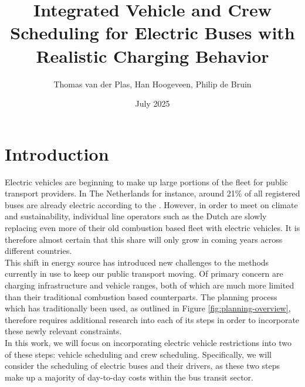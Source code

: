 \documentclass[]{article}
\title{Integrated Vehicle and Crew Scheduling for Electric Buses with Realistic Charging Behavior}
\date{July 2025}
\author{Thomas van der Plas, Han Hoogeveen, Philip de Bruin}
\begin{document}
\maketitle

\section{Introduction}
Electric vehicles are beginning to make up large portions of the fleet for
public transport providers. In The Netherlands for instance, around 21\% of all
registered buses are already electric according to the \citet{RDW}. However,
in order to meet \citet{europaRegulation20181999} on climate and sustainability, individual
line operators such as the Dutch \citet{qbuzzQbuzz} are slowly replacing even more of their old
combustion based fleet with electric vehicles. It is therefore almost certain that this share will only grow in
coming years across different countries. \\
This shift in energy source has introduced new challenges to the methods currently in use to keep our public transport moving. Of primary concern are charging infrastructure and vehicle ranges, both of which are much more limited than their traditional combustion based counterparts. The planning process which has traditionally been used, as outlined in Figure \ref{fig:planning-overview}, therefore requires additional research into each of its steps in order to incorporate these newly relevant constraints.\\
\noindent In this work, we will focus on incorporating electric vehicle restrictions into two of these steps: vehicle scheduling and crew scheduling. Specifically, we will consider the scheduling of electric buses and their drivers, as these two steps make up a majority of day-to-day costs within the bus transit sector. \\
\end{document}
